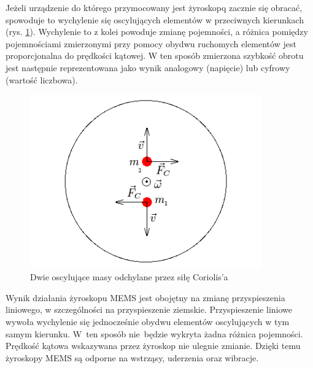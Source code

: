 Jeżeli urządzenie do którego przymocowany jest żyroskopq zacznie się obracać,
spowoduje to wychylenie się oscylujących elementów w przeciwnych kierunkach
(rys. \ref{fig:ZyroCoriolis}). Wychylenie to z kolei powoduje zmianę pojemności, a
różnica pomiędzy pojemnościami zmierzonymi przy pomocy obydwu ruchomych
elementów jest proporcjonalna do prędkości kątowej. W ten sposób zmierzona
szybkość obrotu jest następnie reprezentowana jako wynik analogowy (napięcie)
lub cyfrowy (wartość liczbowa). \begin{figure}[!ht]
 \centering
 \includegraphics[height=75mm]{../images/ch04/gyro-coriolis.png}
 \caption{Dwie oscylujące masy odchylane przez siłę Coriolis'a}
 \label{fig:ZyroCoriolis}
\end{figure}

Wynik działania żyroskopu MEMS jest obojętny na zmianę przyspieszenia liniowego,
w szczególności na przyspieszenie ziemskie. Przyspieszenie liniowe wywoła
wychylenie się jednocześnie obydwu elementów oscylujących w tym samym kierunku. W~ten sposób nie~będzie wykryta żadna różnica pojemności. Prędkość kątowa
wskazywana przez żyroskop nie ulegnie zmianie. Dzięki temu żyroskopy MEMS są
odporne na wstrząsy, uderzenia oraz wibracje.
\\

